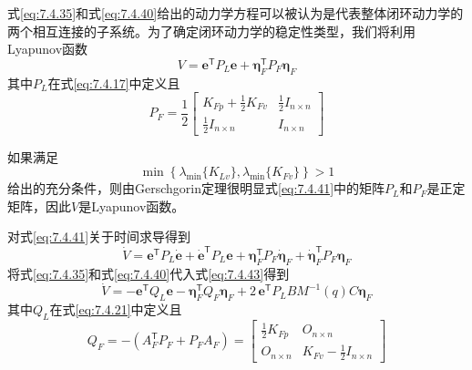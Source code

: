\documentclass[UTF8]{ctexart}
\begin{document}
式\eqref{eq:7.4.35}和式\eqref{eq:7.4.40}给出的动力学方程可以被认为是代表整体闭环动力学的两个相互连接的子系统。为了确定闭环动力学的稳定性类型，我们将利用Lyapunov函数
\begin{equation}\label{eq:7.4.41}
V = \mathbf{e}^{\mathsf T} P_L \mathbf{e} + \boldsymbol{\eta}_F^{\mathsf T} P_F \boldsymbol{\eta}_F
\end{equation}
其中$P_L$在式\eqref{eq:7.4.17}中定义且
\begin{equation*}
P_F = \frac{1}{2} \begin{bmatrix} K_{Fp} + \frac{1}{2}K_{Fv} & \frac{1}{2}I_{n \times n} \\ \frac{1}{2}I_{n \times n} & I_{n \times n} \end{bmatrix}
\end{equation*}

如果满足
\begin{equation}\label{eq:7.4.42}
\min\left\{\lambda_{\min}\{K_{Lv}\},\lambda_{\min}\{K_{Fv}\}\right\} > 1
\end{equation}
给出的充分条件，则由Gerschgorin定理很明显式\eqref{eq:7.4.41}中的矩阵$P_L$和$P_F$是正定矩阵，因此$V$是Lyapunov函数。

对式\eqref{eq:7.4.41}关于时间求导得到
\begin{equation}\label{eq:7.4.43}
\dot{V} = \mathbf{e}^{\mathsf T} P_L \dot{\mathbf{e}} + \dot{\mathbf{e}}^{\mathsf T} P_L \mathbf{e} + \boldsymbol{\eta}_F^{\mathsf T} P_F \dot{\boldsymbol{\eta}}_F + \dot{\boldsymbol{\eta}}_F^{\mathsf T} P_F \boldsymbol{\eta}_F
\end{equation}
将式\eqref{eq:7.4.35}和式\eqref{eq:7.4.40}代入式\eqref{eq:7.4.43}得到
\begin{equation}\label{eq:7.4.44}
\dot{V} = -\mathbf{e}^{\mathsf T} Q_L \mathbf{e} - \boldsymbol{\eta}_F^{\mathsf T} Q_F \boldsymbol{\eta}_F + 2\, \mathbf{e}^{\mathsf T} P_L B M^{-1}(q) C \boldsymbol{\eta}_F
\end{equation}
其中$Q_L$在式\eqref{eq:7.4.21}中定义且
\begin{equation}\label{eq:7.4.45}
Q_F = -(A_F^{\mathsf T} P_F + P_F A_F) = \begin{bmatrix} \frac{1}{2}K_{Fp} & O_{n \times n} \\ O_{n \times n} & K_{Fv} - \frac{1}{2}I_{n \times n} \end{bmatrix}
\end{equation}
\end{document}
